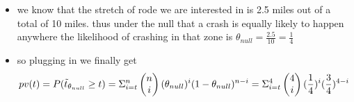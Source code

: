 \documentclass[12pt,twoside]{article}
\begin{document}
\begin{enumerate}
\begin{enumerate}
\begin{itemize}
\item we know that the stretch of rode we are interested in is 2.5 miles out of a total of 10 miles. thus under the null that a crash is equally likely to happen anywhere the likelihood of crashing in that zone is $\theta_{null}=\frac{2.5}{10}=\frac{1}{4}$
\item so plugging in we finally get $$pv(t)=P(\Tilde{t}_{\theta_{null}}\geq t)=\Sigma_{i=t}^{n}\begin{pmatrix}n\\i\end{pmatrix}(\theta_{null})^{i}(1-\theta_{null})^{n-i}=\Sigma_{i=t}^{4}\begin{pmatrix}4\\i\end{pmatrix}(\frac{1}{4})^{i}(\frac{3}{4})^{4-i}$$
\end{itemize}



\end{enumerate}
\end{enumerate}
\end{document}

